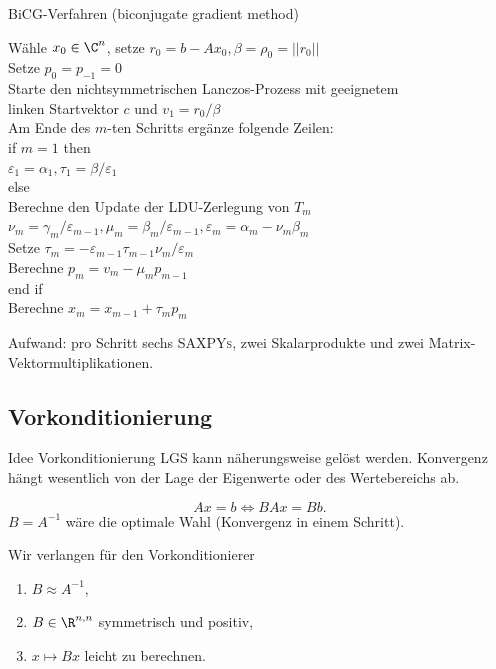 \begin{karte}{BiCG-Verfahren (biconjugate gradient method)}
    \begin{tabbing}
        Wähle \( x_0 \in \C^n \), setze \(r_0 = b - A x_0, \beta = \rho_0 = ||r_0||\) \\
        Setze \( p_0 = p_{-1} = 0 \)  \\
        Starte den nichtsymmetrischen Lanczos-Prozess mit geeignetem \\ 
        linken Startvektor \(c\) und \(v_1 = r_0/\beta\) \\
        Am Ende des \(m\)-ten Schritts ergänze folgende Zeilen:\\
        if \= \(m=1\) then \\
        \> \(\varepsilon_1 = \alpha_1, \tau_1 = \beta/\varepsilon_1\) \\
        else \\
        \> {Berechne den Update der LDU-Zerlegung von \(T_m\)} \\
        \> \( \nu_m = \gamma_m/\varepsilon_{m-1}, \mu_m = \beta_m / \varepsilon_{m-1}, \varepsilon_m = \alpha_m - \nu_m \beta_m \) \\
        \> Setze \( \tau_m = -\varepsilon_{m-1} \tau_{m-1} \nu_m / \varepsilon_m \) \\
        \> Berechne \( p_m = v_m - \mu_m p_{m-1} \) \\
        end if \\
        Berechne \(x_m = x_{m-1} + \tau_m p_m\)
    \end{tabbing}

    Aufwand: pro Schritt sechs \textsc{SAXPYs}, zwei Skalarprodukte und 
    zwei Matrix-Vektormultiplikationen.
\end{karte}

\subsection{Vorkonditionierung}

\begin{karte}{Idee Vorkonditionierung}
    LGS kann näherungsweise gelöst werden. 
    Konvergenz hängt wesentlich von der Lage 
    der Eigenwerte oder des Wertebereichs ab. 

    \[ A x = b \Leftrightarrow BAx = Bb. \]
    \(B = A^{-1}\) wäre die optimale Wahl (Konvergenz in einem Schritt).

    Wir verlangen für den Vorkonditionierer
    \begin{enumerate}
        \item \(B \approx A^{-1}\),
        \item \( B \in \R^{n,n} \) symmetrisch und positiv,
        \item \(x \mapsto Bx\) leicht zu berechnen.
    \end{enumerate}   
\end{karte}

